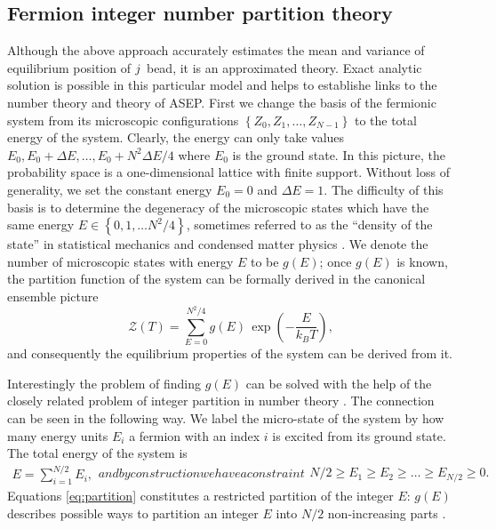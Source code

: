 \documentclass[aps,showpacs,twocolumn,floatfix,prx,superscriptaddress]{revtex4-1}
\begin{document}
\subsection{Fermion integer number partition theory}
Although the above approach accurately estimates the mean and variance of
equilibrium position of $j^{\rm}$ bead, it is an approximated theory. Exact
analytic solution is possible in this particular model and helps to establishe
links to the number theory and theory of ASEP. First we change the basis of the
fermionic system from its microscopic configurations
$\left\{Z_0,Z_1,\ldots,Z_{N-1}\right\}$ to the total energy of the system.
Clearly, the energy can only take values $E_0, E_0+\Delta E, \ldots, E_0 + N^2
\Delta E / 4$ where $E_0$ is the ground state. In this picture, the probability
space is a one-dimensional lattice with finite support. Without loss of
generality, we set the constant energy $E_0=0$ and $\Delta E=1$. The difficulty
of this basis is to determine the degeneracy of the microscopic states which
have the same energy $E \in \left\{0,1,\ldots N^2/4\right\}$, sometimes referred
to as the ``density of the state'' in statistical mechanics
\cite{huang1987statistical} and condensed matter physics
\cite{sander2009advanced}. We denote the number of microscopic states with
energy $E$ to be $g(E)$; once $g(E)$ is known, the partition function of the
system can be formally derived in the canonical ensemble picture
\begin{equation}
\mathcal{Z}\left(T\right) = \sum_{E=0}^{N^2/4} g(E) \, \exp \left(-\frac{E}{k_B T}\right),
\label{eq:par_func}
\end{equation}
and consequently the equilibrium properties of the system can be derived from
it. 

Interestingly the problem of finding $g(E)$ can be solved with the help of the
closely related problem of integer partition in number theory
\cite{andrews1998theory}. The connection can be seen in the following way. We
label the micro-state of the system by how many energy units $E_i$ a fermion
with an index $i$ is excited from its ground state. The total energy of the
system is
\begin{subequations} \label{eq:partition}
\begin{align}
E= \sum_{i=1}^{N/2} E_i,
\end{align}
and by construction we have a constraint 
\begin{align}
N/2 \ge E_1 \ge E_2 \ge \ldots \ge E_{N/2} \ge 0. \label{eq:partition_constraint}
\end{align}
\end{subequations}
Equations \eqref{eq:partition} constitutes a restricted partition of the integer
$E$: $g(E)$ describes possible ways to partition an integer $E$ into $N/2$
non-increasing parts \cite{andrews1998theory}.
\end{document}
